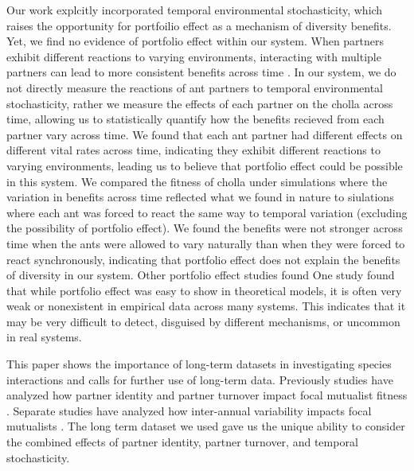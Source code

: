 \documentclass[11pt]{article}
\begin{document}
Our work explcitly incorporated temporal environmental stochasticity, which raises the opportunity for portfoilio effect as a mechanism of diversity benefits. Yet, we find no evidence of portfolio effect within our system. 
When partners exhibit different reactions to varying environments, interacting with multiple partners can lead to more consistent benefits across time \citep{Batstone2018}.
In our system, we do not directly measure the reactions of ant partners to temporal environmental stochasticity, rather we measure the effects of each partner on the cholla across time, allowing us to statistically quantify how the benefits recieved from each partner vary across time.
We found that each ant partner had different effects on different vital rates across time,  indicating they exhibit different reactions to varying environments, leading us to believe that portfolio effect could be possible in this system. 
We compared the fitness of cholla under simulations where the variation in benefits across time reflected what we found in nature to siulations where each ant was forced to react the same way to temporal variation (excluding the possibility of portfolio effect).
We found the benefits were not stronger across time when the ants were allowed to vary naturally than when they were forced to react synchronously, indicating that portfolio effect does not explain the benefits of diversity in our system.
Other portfolio effect studies \citep{Lazaro2022,Tornos2023} found 
One study \cite{dallas2022temporal} found that while portfolio effect was easy to show in theoretical models, it is often very weak or nonexistent in empirical data across many systems. 
This indicates that it may be very difficult to detect, disguised by different mechanisms, or uncommon in real systems.

This paper shows the importance of long-term datasets in investigating species interactions and calls for further use of long-term data. 
Previously studies have analyzed how partner identity and partner turnover impact focal mutualist fitness \cite{Fonseca2003, Dejean2008, Noe1994, Barrett2015, Bruna2014, Trojelsgaard2015}.
Separate studies have analyzed how inter-annual variability impacts focal mutualists \cite{Alonso1998, Alarcon2008, Ollerton2006, Horvitz1990, Lazaro2022}.
The long term dataset we used gave us the unique ability to consider the combined effects of partner identity, partner turnover, and temporal stochasticity.
\end{document}
